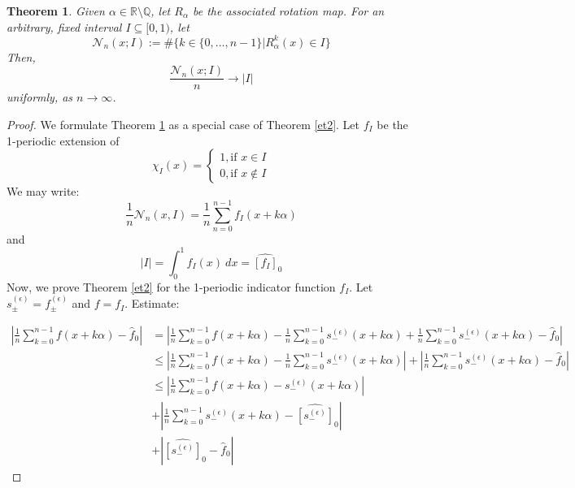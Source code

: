 \documentclass[12pt, reqno]{amsart}
\newtheorem{theorem}{Theorem}[section]
\theoremstyle{definition}
\theoremstyle{remark}
\begin{document}
\begin{itemize}
\begin{itemize}
\begin{theorem} \label{et1}
    Given $\alpha\in \mathbb{R}\setminus\mathbb{Q}$, let $R_\alpha$ be the associated rotation map. For an arbitrary, fixed interval $I\subseteq[0,1)$, let $$\mathcal{N}_{n}(x;I):=\#\{k\in\{0,\ldots,n-1\}|R_{\alpha}^{k}(x)\in I\}$$Then, $$\frac{\mathcal{N}_{n}(x;I)}{n}\rightarrow |I|$$uniformly, as $n \rightarrow \infty$.
\end{theorem}

\begin{proof}
    
We formulate Theorem \ref{et1} as a special case of Theorem \ref{et2}. Let $f_I$ be the 1-periodic extension of 
$$\chi_{I}(x)=\begin{cases}1,\text{if }x\in I \\
0,\text{if }x\notin I\end{cases}$$
We may write: $$\frac{1}{n}\mathcal{N}_{n}(x,I)= \frac{1}{n}\sum_{n=0}^{n-1}f_{I}(x+k \alpha)$$and $$|I|=\int_{0}^{1}f_{I}(x)\ dx=\widehat{[f_{I}]}_{0}$$
Now, we prove Theorem \ref{et2} for the 1-periodic indicator function $f_{I}$.
\vspace*{10 pt}
Let $s_\pm^{(\epsilon)}=f_\pm^{(\epsilon)}$ and $f=f_I$. Estimate:

\begin{align}
\left| \frac{1}{n}\sum_{k=0}^{n-1}f(x+k \alpha)-\hat f_{0}\right|&= \left| \frac{1}{n}\sum_{k=0}^{n-1}f(x+k \alpha) - \frac{1}{n}\sum_{k=0}^{n-1}s_{-}^{(\epsilon)}(x+k \alpha)+\frac{1}{n}\sum_{k=0}^{n-1}s_{-}^{(\epsilon)}(x+k \alpha)-\hat f_{0}\right|\\
&\le \left| \frac{1}{n}\sum_{k=0}^{n-1}f(x+k \alpha) - \frac{1}{n}\sum_{k=0}^{n-1}s_{-}^{(\epsilon)}(x+k \alpha)\right|+\left|\frac{1}{n}\sum_{k=0}^{n-1}s_{-}^{(\epsilon)}(x+k \alpha)-\hat f_{0}\right|\\
&\le \left| \frac{1}{n}\sum_{k=0}^{n-1}f(x+k\alpha)-s_{-}^{(\epsilon)}(x+k \alpha)\right|\label{fs}
\\
&+ \left| \frac{1}{n}\sum_{k=0}^{n-1}s_{-}^{(\epsilon)}(x+k \alpha)-\widehat{[s_{-}^{(\epsilon)}]}_{0}\right|\label{sset}
\\
&+\left|\widehat{[s_{-}^{(\epsilon)}]}_{0}-\hat f_{0}\right|\label{fcs}
\end{align}


\end{proof}
\end{itemize}
\end{itemize}
\end{document}
